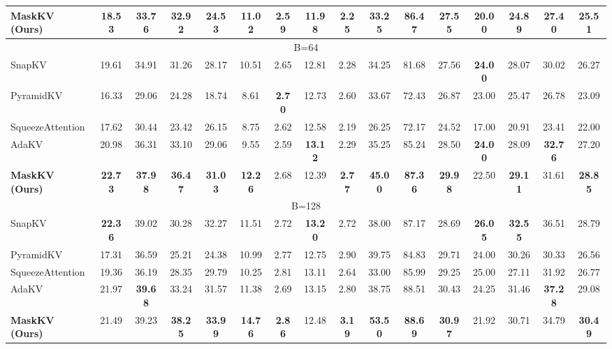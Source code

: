 \begin{table*}[t!]
{\begin{tabular}{@{}l*{15}{c}@{}}
        \rowcolor{lightgreen} \textbf{MaskKV (Ours)} & \textbf{18.53} & \textbf{33.76} & \textbf{32.92} & 24.53 & \textbf{11.02} & 2.59 & 11.98 & \textbf{2.25} & \textbf{33.25} & \textbf{86.47} & \textbf{27.55} & \textbf{20.00} & \textbf{24.89} & \textbf{27.40} & \textbf{25.51} \\
        \midrule
        \multicolumn{16}{c}{\small B=64} \\
        \midrule
        SnapKV & 19.61 & 34.91 & 31.26 & 28.17 & 10.51 & 2.65 & 12.81 & 2.28 & 34.25 & 81.68 & 27.56 & \textbf{24.00} & 28.07 & 30.02 & 26.27 \\
        PyramidKV & 16.33 & 29.06 & 24.28 & 18.74 & 8.61 & \textbf{2.70} & 12.73 & 2.60 & 33.67 & 72.43 & 26.87 & 23.00 & 25.47 & 26.78 & 23.09 \\
        SqueezeAttention & 17.62 & 30.44 & 23.42 & 26.15 & 8.75 & 2.62 & 12.58 & 2.19 & 26.25 & 72.17 & 24.52 & 17.00 & 20.91 & 23.41 & 22.00 \\
        AdaKV & 20.98 & 36.31 & 33.10 & 29.06 & 9.55 & 2.59 & \textbf{13.12} & 2.29 & 35.25 & 85.24 & 28.50 & \textbf{24.00} & 28.09 & \textbf{32.76} & 27.20 \\
        \rowcolor{lightgreen} \textbf{MaskKV (Ours)} & \textbf{22.73} & \textbf{37.98} & \textbf{36.47} & \textbf{31.03} & \textbf{12.26} & 2.68 & 12.39 & \textbf{2.77} & \textbf{45.00} & \textbf{87.36} & \textbf{29.98} & 22.50 & \textbf{29.11} & 31.61 & \textbf{28.85} \\
        \midrule
        \multicolumn{16}{c}{\small B=128} \\
        \midrule
        SnapKV & \textbf{22.36} & 39.02 & 30.28 & 32.27 & 11.51 & 2.72 & \textbf{13.20} & 2.72 & 38.00 & 87.17 & 28.69 & \textbf{26.05} & \textbf{32.55} & 36.51 & 28.79 \\
        PyramidKV & 17.31 & 36.59 & 25.21 & 24.38 & 10.99 & 2.77 & 12.75 & 2.90 & 39.75 & 84.83 & 29.71 & 24.00 & 30.26 & 30.33 & 26.56 \\
        SqueezeAttention & 19.36 & 36.19 & 28.35 & 29.79 & 10.25 & 2.81 & 13.11 & 2.64 & 33.00 & 85.99 & 29.25 & 25.00 & 27.11 & 31.92 & 26.77 \\
        AdaKV & 21.97 & \textbf{39.68} & 33.24 & 31.57 & 11.38 & 2.69 & 13.15 & 2.80 & 38.75 & 88.51 & 30.43 & 24.25 & 31.46 & \textbf{37.28} & 29.08 \\
        \rowcolor{lightgreen} \textbf{MaskKV (Ours)} & 21.49 & 39.23 & \textbf{38.25} & \textbf{33.99} & \textbf{14.76} & \textbf{2.86} & 12.48 & \textbf{3.19} & \textbf{53.50} & \textbf{88.69} & \textbf{30.97} & 21.92 & 30.71 & 34.79 & \textbf{30.49} \\

\end{tabular}}
\end{table*}
